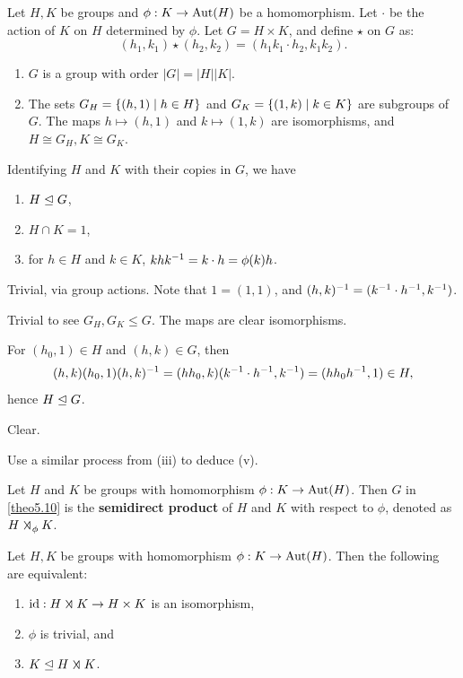  \label{theo5.10}
Let $H, K$ be groups and $\phi : K \to \operatorname{Aut}(H)$ be a homomorphism. Let $\cdot$ be the action of $K$ on $H$ determined by $\phi$. Let $G = H \times K$, and define $\star$ on $G$ as:
\[(h_1, k_1) \star (h_2, k_2) = (h_1 k_1 \cdot h_2, k_1k_2).\]
\begin{enumerate}
    \item $G$ is a group with order $|G| = |H||K|$.
    \item The sets $G_H = \{(h, 1) \mid h \in H\}$ and $G_K = \{(1, k) \mid k \in K\}$ are subgroups of $G$. The maps $h \mapsto (h, 1)$ and $k \mapsto (1, k)$ are isomorphisms, and $H \cong G_H, K \cong G_K$.
\end{enumerate}
Identifying $H$ and $K$ with their copies in $G$, we have
\begin{enumerate}[resume]
    \item $H \trianglelefteq G$,
    \item $H \cap K = 1$,
    \item for $h \in H$ and $k \in K$, $khk^{-1} = k \cdot h = \phi(k)h$.
\end{enumerate}

\begin{proofnum}
    \item Trivial, via group actions. Note that $1 = (1, 1)$, and $(h, k)^{-1} = (k^{-1} \cdot h^{-1}, k^{-1})$.
    \item Trivial to see $G_H, G_K \leq G$. The maps are clear isomorphisms.
    \item For $(h_0, 1) \in H$ and $(h, k) \in G$, then
    \[(h, k)(h_0, 1)(h, k)^{-1} = (hh_0, k)(k^{-1} \cdot h^{-1}, k^{-1}) = (hh_0h^{-1}, 1) \in H,\]
    hence $H \trianglelefteq G$.
    \item Clear.
    \item Use a similar process from (iii) to deduce (v).
\end{proofnum}

 Let $H$ and $K$ be groups with homomorphism $\phi : K \to \operatorname{Aut}(H)$. Then $G$ in \autoref{theo5.10} is the \textbf{semidirect product} of $H$ and $K$ with respect to $\phi$, denoted as $H \semidir_\phi K$.

 \label{prop5.11}
Let $H, K$ be groups with homomorphism $\phi : K \to \operatorname{Aut}(H)$. Then the following are equivalent:
\begin{enumerate}
    \item $\id : H \semidir K \to H \times K$ is an isomorphism,
    \item $\phi$ is trivial, and
    \item $K \nsub H \semidir K$.
\end{enumerate}

